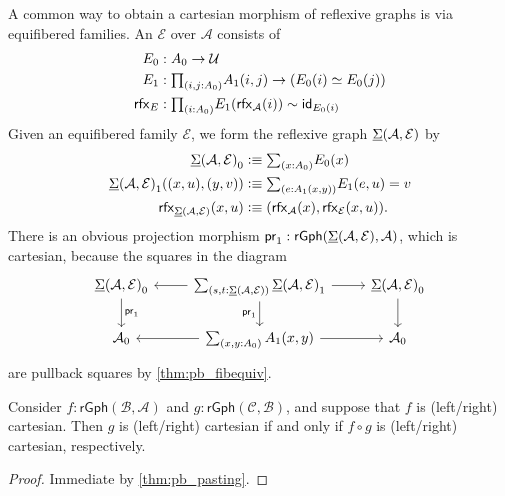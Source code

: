 \begin{eg}
A common way to obtain a cartesian morphism of reflexive graphs is via equifibered families.
An  $\mathcal{E}$ over $\mathcal{A}$ consists of
\begin{align*}
\pts{E} & : \pts{A}\to\UU \\
\edg{E} & : \prd{i,j:\pts{A}} \edg{A}(i,j)\to (\eqv{\pts{E}(i)}{\pts{E}(j)}) \\
\rfx{E} & : \prd{i:\pts{A}} \edg{E}(\rfx{\mathcal{A}}(i))\htpy \idfunc[\pts{E}(i)]
\end{align*}
Given an equifibered family $\mathcal{E}$, we form the reflexive graph $\underline{\Sigma}(\mathcal{A},\mathcal{E})$ by
\begin{align*}
\pts{\msm{\mathcal{A}}{\mathcal{E}}} & \defeq \sm{x:\pts{A}}\pts{E}(x) \\
\edg{\msm{\mathcal{A}}{\mathcal{E}}}((x,u),(y,v)) & \defeq \sm{e:\edg{A}(x,y)} \edg{E}(e,u) = v \\
\rfx{\msm{\mathcal{A}}{\mathcal{E}}}(x,u) & \defeq (\rfx{\mathcal{A}}(x),\rfx{\mathcal{E}}(x,u)).
\end{align*}
There is an obvious projection morphism $\mathsf{pr}_{1} : \mathsf{rGph}(\underline{\Sigma}(\mathcal{A},\mathcal{E}),\mathcal{A})$, which is cartesian, because the squares in the diagram
\begin{equation*}
\begin{tikzcd}
\pts{\msm{\mathcal{A}}{\mathcal{E}}} \arrow[d,"\proj 1"] & \sm{s,t:\msm{\mathcal{A}}{\mathcal{E}}}\edg{\msm{\mathcal{A}}{\mathcal{E}}} \arrow[l] \arrow[r] \arrow[d,swap,"\proj 1"] & \pts{\msm{\mathcal{A}}{\mathcal{E}}} \arrow[d] \\
\pts{\mathcal{A}} & \sm{x,y:\pts{A}}\edg{A}(x,y) \arrow[l] \arrow[r] & \pts{\mathcal{A}}
\end{tikzcd}
\end{equation*}
are pullback squares by \cref{thm:pb_fibequiv}.
\end{eg}

\begin{lem}
Consider $f:\mathsf{rGph}(\mathcal{B},\mathcal{A})$ and $g:\mathsf{rGph}(\mathcal{C},\mathcal{B})$, and suppose that $f$ is (left/right) cartesian. Then $g$ is (left/right) cartesian if and only if $f\circ g$ is (left/right) cartesian, respectively.
\end{lem}

\begin{proof}
Immediate by \cref{thm:pb_pasting}.
\end{proof}

